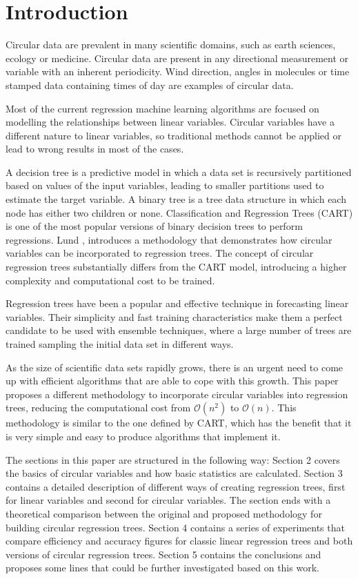\documentclass[times,twocolumn,final,authoryear]{elsarticle}
\begin{document}

\section{Introduction}
\label{intro}
Circular data are prevalent in many scientific domains, such as earth sciences, ecology or medicine. Circular data are present in any directional measurement or variable with an inherent periodicity. Wind direction, angles in molecules or time stamped data containing times of day are examples of circular data.

Most of the current regression machine learning algorithms are focused on modelling the relationships between linear variables. Circular variables have a different nature to linear variables, so traditional methods cannot be applied or lead to wrong results in most of the cases.

A decision tree is a predictive model in which a data set is recursively partitioned based on values of the input variables, leading to smaller partitions used to estimate the target variable. A binary tree is a tree data structure in which each node has either two children or none. Classification and Regression Trees (CART) \citep{Breimanetal1984} is one of the most popular versions of binary decision trees to perform regressions. Lund \citep{Lund2002}, introduces a methodology that demonstrates how circular variables can be incorporated to regression trees. The concept of circular regression trees substantially differs from the CART model, introducing a higher complexity and computational cost to be trained. 

Regression trees have been a popular and effective technique in forecasting linear variables. Their simplicity and fast training characteristics make them a perfect candidate to be used with ensemble techniques, where a large number of trees are trained sampling the initial data set in different ways.

As the size of scientific data sets rapidly grows, there is an urgent need to come up with efficient algorithms that are able to cope with this growth. This paper proposes a different methodology to incorporate circular variables into regression trees, reducing the computational cost from $\mathcal{O}(n^2)$ to $\mathcal{O}(n)$. This methodology is similar to the one defined by CART, which has the benefit that it is very simple and easy to produce algorithms that implement it.

The sections in this paper are structured in the following way: Section 2 covers the basics of circular variables and how basic statistics are calculated. Section 3 contains a detailed description of different ways of creating regression trees, first for linear variables and second for circular variables. The section ends with a theoretical comparison between the original and proposed methodology for building circular regression trees. Section 4 contains a series of experiments that compare efficiency and accuracy figures for classic linear regression trees and both versions of circular regression trees. Section 5 contains the conclusions and proposes some lines that could be further investigated based on this work.
\end{document}
